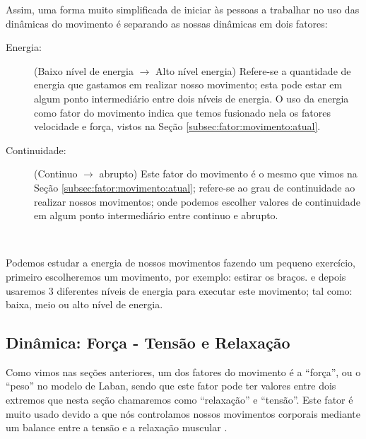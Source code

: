 Assim, 
uma forma muito simplificada de iniciar às pessoas 
a trabalhar no uso das dinâmicas do movimento 
é separando as nossas dinâmicas em dois fatores:
\begin{description}
\item[Energia:] (Baixo nível de energia $\rightarrow$ Alto nível energia)
Refere-se a quantidade de energia que gastamos em realizar nosso movimento;
esta pode estar em algum ponto intermediário entre dois níveis de energia. 
O uso da energia como fator do movimento indica que temos fusionado nela os 
fatores velocidade e força, vistos na Seção  \ref{subsec:fator:movimento:atual}.
\item[Continuidade:] (Continuo $\rightarrow$ abrupto)
Este fator do movimento é o mesmo que vimos na Seção \ref{subsec:fator:movimento:atual};
refere-se ao grau de continuidade ao realizar nossos movimentos;
onde podemos escolher valores de continuidade em algum ponto intermediário entre continuo e abrupto.
\end{description}~

\begin{example}
Podemos estudar a energia de nossos movimentos fazendo um pequeno exercício,
primeiro escolheremos um movimento, por exemplo: estirar os braços.
e depois usaremos 3 diferentes níveis de energia para executar este movimento;
tal como: baixa, meio ou alto nível de energia.
\end{example}

\subsection{Dinâmica: Força - Tensão e Relaxação }
\label{sec:musicalidadetensionrelease}



Como vimos nas seções anteriores,
um dos fatores do movimento é a ``força'', 
ou o ``peso'' no modelo de Laban,
sendo que este fator pode ter valores entre dois extremos 
que nesta seção chamaremos como ``relaxação'' e ``tensão''.
Este fator é muito usado 
devido a que nós controlamos nossos movimentos corporais 
mediante um balance entre a tensão e a relaxação muscular \cite[pp. 7]{schrader2005sense}.

